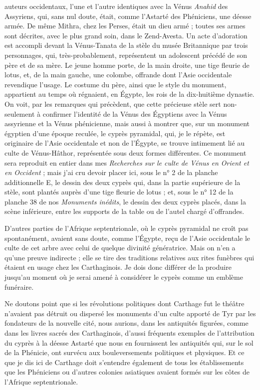\documentclass[a4paper, 11pt, oneside, polutonikogreek, french]{article}
\begin{document}
auteurs occidentaux, l'une et l'autre identiques avec la Vénus \emph{Anahid} des Assyriens, qui, sans nul doute, était, comme l'Astarté des Phéniciens, une déesse armée. De même Mithra, chez les Perses, était un dieu armé ; toutes ses armes sont décrites, avec le plus grand soin, dans le Zend-Avesta. Un acte d'adoration est accompli devant la Vénus-Tanata de la stèle du musée Britannique par trois personnages, qui, très-probablement, représentent un adolescent précédé de son père et de sa mère. Le jeune homme porte, de la main droite, une tige fleurie de lotus, et, de la main gauche, une colombe, offrande dont l'Asie occidentale revendique l'usage. Le costume du père, ainsi que le style du monument, appartient au temps où régnaient, en Égypte, les rois de la dix-huitième dynastie. On voit, par les remarques qui précèdent, que cette précieuse stèle sert non-seulement à confirmer l'identité de la Vénus des Égyptiens avec la Vénus assyrienne et la Vénus phénicienne, mais aussi à montrer que, sur un monument égyptien d'une époque reculée, le cyprès pyramidal, qui, je le répète, est originaire de l'Asie occidentale et non de l'Égypte, se trouve intimement lié au culte de Vénus-Hâthor, représentée sous deux formes différentes. Ce monument sera reproduit en entier dans mes \emph{Recherches sur le culte de Vénus en Orient et en Occident} ; mais j'ai cru devoir placer ici, sous le n° 2 de la planche additionnelle E, le dessin des deux cyprès qui, dans la partie supérieure de la stèle, sont plantés auprès d'une tige fleurie de lotus ; et, sous le n° 12 de la planche 38 de nos \emph{Monuments inédits}, le dessin des deux cyprès placés, dans la scène inférieure, entre les supports de la table ou de l'autel chargé d'offrandes.

D'autres parties de l'Afrique septentrionale, où le cyprès pyramidal ne croît pas spontanément, avaient sans doute, comme l'Égypte, reçu de l'Asie occidentale le culte de cet arbre avec celui de quelque divinité génératrice. Mais on n'en a qu'une preuve indirecte ; elle se tire des traditions relatives aux rites funèbres qui étaient en usage chez les Carthaginois. Je dois donc différer de la produire jusqu'au moment où je serai amené à considérer le cyprès comme un emblème funéraire.

Ne doutons point que si les révolutions politiques dont Carthage fut le théâtre n'avaient pas détruit ou dispersé les monuments d'un culte apporté de Tyr par les fondateurs de la nouvelle cité, nous aurions, dans les antiquités figurées, comme dans les livres sacrés des Carthaginois, d'aussi fréquents exemples de l'attribution du cyprès à la déesse Astarté que nous en fournissent les antiquités qui, sur le sol de la Phénicie, ont survécu aux bouleversements politiques et physiques. Et ce que je dis ici de Carthage doit s'entendre également de tous les établissements que les Phéniciens ou d'autres colonies asiatiques avaient formés sur les côtes de l'Afrique septentrionale.
\clearpage
\end{document}
